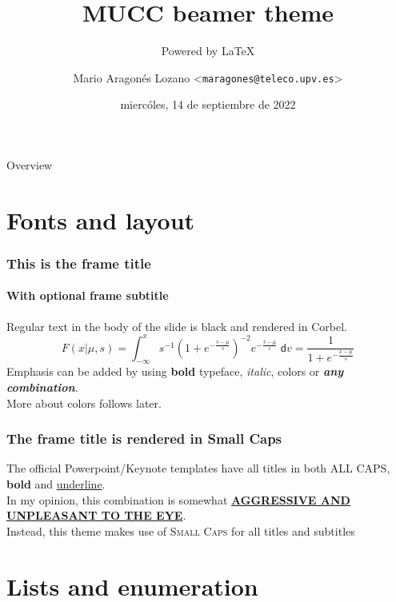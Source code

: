 \documentclass[aspectratio=169]{beamer}
\title{MUCC beamer theme}
\subtitle{Powered by \LaTeX}
\date{miercóles, 14 de septiembre de 2022}
\author[maarlo]{Mario Aragonés Lozano <\texttt{maragones@teleco.upv.es}>}
\begin{document}
\titleframe

\begin{frame}{Overview}
    \tableofcontents[hideallsubsections]
\end{frame}

\section{Fonts and layout}

\begin{frame}
    \frametitle{This is the frame title}
    \framesubtitle{With optional frame subtitle}
    Regular text in the body of the slide is black and rendered in Corbel.\\[.5cm]
    \begin{equation*}
        F(x|\mu,s) = \int_{-\infty}^x s^{-1}\left(1+e^{-\frac{v-\mu}{s}}\right)^{-2} e^{-\frac{v-\mu}{s}}\;\mathsf{d}v = \frac{1}{1+e^{-\frac{x-\mu}{s}}}
    \end{equation*}
    Emphasis can be added by using \textbf{bold} typeface, \textit{italic}, {\color{mucc-alert}colors} or {\color{mucc-alert}\textbf{\textit{any combination}}}.\\
    More about colors follows later.
\end{frame}

\begin{frame}
    \frametitle{The frame title is rendered in Small Caps}
    The official Powerpoint/Keynote templates have all titles in both ALL CAPS, \textbf{bold} and \underline{underline}.\\[.5cm]
    In my opinion, this combination is somewhat \underline{\textbf{AGGRESSIVE AND UNPLEASANT TO THE EYE}}.\\[.5cm]
    Instead, this theme makes use of \textsc{Small Caps} for all titles and subtitles
\end{frame}


\section{Lists and enumeration}
\end{document}
